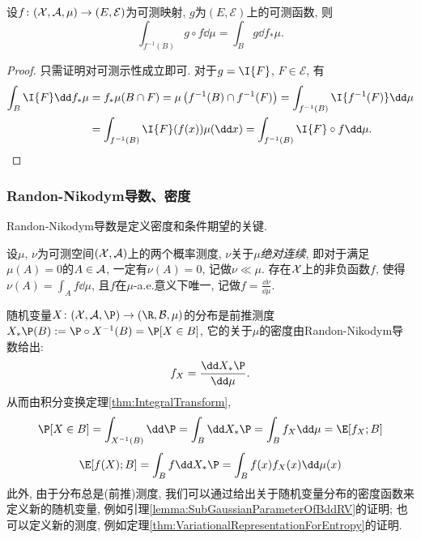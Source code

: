 \begin{theorem}[积分变换]\label{thm:IntegralTransform}
	设$f \colon (\mathcal{X}, \mathcal{A}, \mu) \to (E, \mathcal{E})$为可测映射, $g$为$(E, \mathcal{E})$上的可测函数, 则
	\begin{equation*}
		\int_{f^{-1}(B)} g \circ f \dd \mu 
		= \int_B g \dd f_* \mu. 
	\end{equation*}
\end{theorem}
\begin{proof}
	只需证明对可测示性成立即可. 
	对于$g = \I{F}$, $F \in \mathcal{E}$, 有
	\begin{align*}
		\int_B \I{F} \dd f_* \mu
		&= f_* \mu(B \cap F)
		= \mu \left( f^{-1}(B) \cap f^{-1}(F) \right)
		= \int_{f^{-1}(B)} \I{f^{-1}(F)} \dd \mu \\
		&= \int_{f^{-1}(B)} \I{F}(f(x)) \mu(\dd x)
		=\int_{f^{-1}(B)} \I{F} \circ f \dd \mu. 
	\end{align*}
\end{proof}




\subsubsection{Randon-Nikodym导数、密度}

Randon-Nikodym导数是定义密度和条件期望的关键. 

\begin{theorem}
	设$\mu$, $\nu$为可测空间$(\mathcal{X}, \mathcal{A})$上的两个概率测度, $\nu$关于$\mu$\emph{绝对连续}, 即对于满足$\mu(A) = 0$的$A \in \mathcal{A}$, 一定有$\nu(A) = 0$, 记做$\nu \ll \mu$. 
	存在$\mathcal{X}$上的非负函数$f$, 使得$\nu(A) = \int_A f \dd \mu$, 且$f$在$\mu$-a.e.意义下唯一, 记做$f = \frac{\dd \nu}{\dd \mu}$. 
\end{theorem}

\begin{example}[分布的密度]
	随机变量$X \colon (\cX, \cA, \P) \to (\R, \cB, \mu)$的分布是前推测度$X_* \P (B) := \P \circ X^{-1} (B) = \P[X \in B]$, 它的关于$\mu$的密度由Randon-Nikodym导数给出: 
	\begin{equation*}
		f_X = \frac{\dd X_* \P}{\dd \mu}. 
	\end{equation*}
	从而由积分变换定理\ref{thm:IntegralTransform}, 
	\begin{equation*}
		\P[X \in B] 
		= \int_{X^{-1}(B)} \dd \P 
		= \int_B \dd X_* \P 
		= \int_B f_X \dd \mu
		= \E[f_X; B]
	\end{equation*}
	\begin{equation*}
		\E[f(X); B]
		= \int_B f \dd X_* \P 
		= \int_B f(x) f_X(x) \dd \mu(x)
	\end{equation*}
	此外, 由于分布总是(前推)测度, 我们可以通过给出关于随机变量分布的密度函数来定义新的随机变量, 例如引理\ref{lemma:SubGaussianParameterOfBddRV}的证明; 也可以定义新的测度, 例如定理\ref{thm:VariationalRepresentationForEntropy}的证明. 
\end{example}



